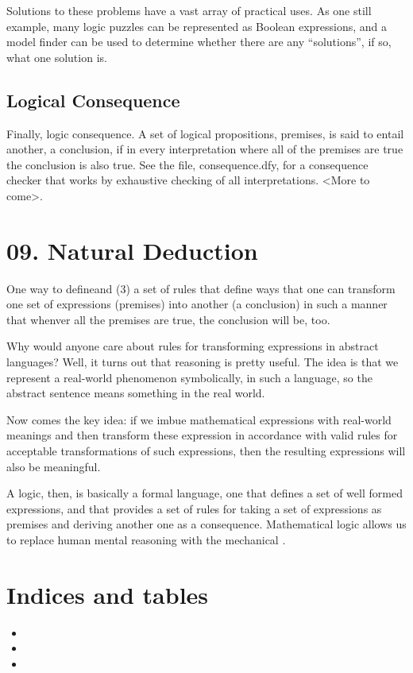 \documentclass[letterpaper,10pt,english]{sphinxmanual}
\begin{document}
Solutions to these problems have a vast array of practical uses.  As
one still example, many logic puzzles can be represented as Boolean
expressions, and a model finder can be used to determine whether there
are any “solutions”, if so, what one solution is.


\section{Logical Consequence}
\label{\detokenize{08-propositional-logic:logical-consequence}}
Finally, logic consequence. A set of logical propositions, premises,
is said to entail another, a conclusion, if in every interpretation
where all of the premises are true the conclusion is also true. See
the file, consequence.dfy, for a consequence checker that works by
exhaustive checking of all interpretations. \textless{}More to come\textgreater{}.


\chapter{09. Natural Deduction}
\label{\detokenize{09-natural-deduction::doc}}\label{\detokenize{09-natural-deduction:natural-deduction}}
One way
to defineand (3) a set of  rules that define ways that one
can transform one set of expressions (premises) into another (a
conclusion) in such a manner that whenver all the premises are true,
the conclusion will be, too.

Why would anyone care about rules for transforming expressions in
abstract languages? Well, it turns out that  reasoning is
pretty useful. The idea is that we represent a real-world phenomenon
symbolically, in such a language, so the abstract sentence means
something in the real world.

Now comes the key idea: if we imbue mathematical expressions with
real-world meanings and then transform these expression in accordance
with valid rules for acceptable transformations of such expressions,
then the resulting expressions will also be meaningful.

A logic, then, is basically a formal language, one that defines a set
of well formed expressions, and that provides a set of 
rules for taking a set of expressions as premises and deriving another
one as a consequence. Mathematical logic allows us to replace human
mental reasoning with the mechanical .


\chapter{Indices and tables}
\label{\detokenize{index:indices-and-tables}}\begin{itemize}
\item {} 

\item {} 

\item {} 

\end{itemize}



\renewcommand{\indexname}{Index}
\printindex
\end{document}

